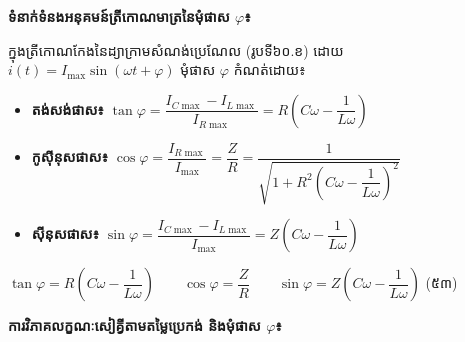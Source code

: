 \vspace{0.2em}
\noindent
\textbf{ទំនាក់ទំនងអនុគមន៍ត្រីកោណមាត្រនៃមុំផាស $\varphi$៖}

\noindent
ក្នុងត្រីកោណកែងនៃដ្យាក្រាមសំណង់ប្រេណែល (រូបទី៦០.ខ) ដោយ $i(t) = I_{\max}\sin(\omega t + \varphi)$ មុំផាស $\varphi$ កំណត់ដោយ៖
\begin{itemize}[itemsep=1.5pt, topsep=1pt, parsep=0pt, leftmargin=1.5em]
	\item \textbf{តង់សង់ផាស៖} $\tan\varphi = \dfrac{I_{C\max} - I_{L\max}}{I_{R\max}} = R\left(C\omega - \dfrac{1}{L\omega}\right)$
	\item \textbf{កូស៊ីនុសផាស៖} $\cos\varphi = \dfrac{I_{R\max}}{I_{\max}} = \dfrac{Z}{R} = \dfrac{1}{\sqrt{1 + R^2\left(C\omega - \dfrac{1}{L\omega}\right)^2}}$
	\item \textbf{ស៊ីនុសផាស៖} $\sin\varphi = \dfrac{I_{C\max} - I_{L\max}}{I_{\max}} = Z\left(C\omega - \dfrac{1}{L\omega}\right)$
\end{itemize}

\begin{center}
	$\boxed{\tan\varphi = R\left(C\omega - \dfrac{1}{L\omega}\right)} \qquad \boxed{\cos\varphi = \dfrac{Z}{R}} \qquad \boxed{ \sin\varphi = Z\left(C\omega - \dfrac{1}{L\omega}\right) }$ \quad (៥៣)
\end{center}

\pagebreak
\noindent
\textbf{ការវិភាគលក្ខណៈសៀគ្វីតាមតម្លៃប្រេកង់ និងមុំផាស $\varphi$៖}

